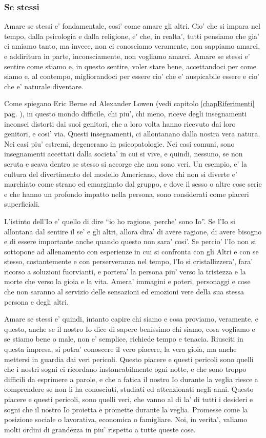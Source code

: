 \subsubsection{Se stessi}
Amare se stessi e' fondamentale, cosi' come amare gli altri. Cio' che si impara nel tempo, dalla psicologia e dalla religione, e' che, in realta', tutti pensiamo che gia' ci amiamo tanto, ma invece, non ci conosciamo veramente, non sappiamo amarci, e addiritura in parte, inconsciamente, non vogliamo amarci. 
Amare se stessi e' sentire come stiamo e, in questo sentire, voler stare bene, accettandoci per come siamo e, al contempo, migliorandoci per essere cio' che e' auspicabile essere e cio' che e' naturale diventare.

Come spiegano Eric Berne ed Alexander Lowen (vedi capitolo \ref{chapRiferimenti} pag. \pageref{chapRiferimenti}), in questo mondo difficile, chi piu', chi meno, riceve degli insegnamenti inconsci distorti dai suoi genitori, che a loro volta hanno ricevuto dai loro genitori, e cosi' via. Questi insegnamenti, ci allontanano dalla nostra vera natura. Nei casi piu' estremi, degenerano in psicopatologie. Nei casi comuni, sono insegnamenti accettati dalla societa' in cui si vive, e quindi, nessuno, se non scruta e scava dentro se stesso si accorge che non sono veri. Un esempio, e' la cultura del divertimento del modello Americano, dove chi non si diverte e' marchiato come strano ed emarginato dal gruppo, e dove il sesso o altre cose serie e che hanno un profondo impatto nella persona, sono considerati come piaceri superficiali.

L'istinto dell'Io e' quello di dire ``io ho ragione, perche' sono Io''. Se l'Io si allontana dal sentire il se' e gli altri, allora dira' di avere ragione, di avere bisogno e di essere importante anche quando questo non sara' cosi'. Se percio' l'Io non si sottopone ad allenamento con esperienze in cui si confronta con gli Altri e con se stesso, costantemente e con perserveranza nel tempo, l'Io si cristallizzera', fara' ricorso a soluzioni fuorvianti, e portera' la persona piu' verso la tristezza e la morte che verso la gioia e la vita. Amera' immagini e poteri, personaggi e cose che non saranno al servizio delle sensazioni ed emozioni vere della sua stessa persona e degli altri.

Amare se stessi e' quindi, intanto capire chi siamo e cosa proviamo, veramente, e questo, anche se il nostro Io dice di sapere benissimo chi siamo, cosa vogliamo e se stiamo bene o male, non e' semplice, richiede tempo e tenacia. Riusciti in questa impresa, si potra' conoscere il vero piacere, la vera gioia, ma anche mettersi in guardia dai veri pericoli. Questo piacere e questi pericoli sono quelli che i nostri sogni ci ricordano instancabilmente ogni notte, e che sono troppo difficili da esprimere a parole, e che a fatica il nostro Io durante la veglia riesce a comprendere se non li ha conosciuti, studiati ed attenzionati negli anni. Questo piacere e questi pericoli, sono quelli veri, che vanno al di la' di tutti i desideri e sogni che il nostro Io proietta e promette durante la veglia. Promesse come la posizione sociale o lavorativa, economica o famigliare. Noi, in verita', valiamo molti ordini di grandezza in piu' rispetto a tutte queste cose.

